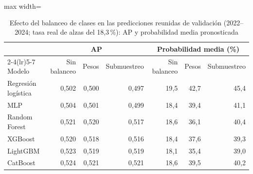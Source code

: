\begin{table}[htbp]\centering\small
\caption{Efecto del balanceo de clases en las predicciones reunidas de validación (2022--2024; tasa real de alzas del 18{,}3\,\%): AP y probabilidad media pronosticada}\label{tab:balanceo}
\begin{adjustbox}{max width=\textwidth}\begin{tabular}{lrrrrrr}\toprule
& \multicolumn{3}{c}{AP} & \multicolumn{3}{c}{Probabilidad media (\%)}\\ \cmidrule(lr){2-4}\cmidrule(lr){5-7}
Modelo & Sin balanceo & Pesos & Submuestreo & Sin balanceo & Pesos & Submuestreo\\ \midrule
Regresión logística & 0{,}502 & 0{,}500 & 0{,}497 & 19{,}5 & 42{,}7 & 45{,}4 \\
MLP & 0{,}504 & 0{,}501 & 0{,}499 & 18{,}4 & 39{,}4 & 41{,}1 \\
Random Forest & 0{,}521 & 0{,}520 & 0{,}517 & 18{,}6 & 36{,}1 & 40{,}4 \\
XGBoost & 0{,}520 & 0{,}518 & 0{,}516 & 18{,}4 & 37{,}6 & 39{,}3 \\
LightGBM & 0{,}523 & 0{,}519 & 0{,}519 & 18{,}1 & 35{,}4 & 39{,}0 \\
CatBoost & 0{,}524 & 0{,}521 & 0{,}521 & 18{,}6 & 39{,}5 & 40{,}2 \\
\bottomrule\end{tabular}\end{adjustbox}\end{table}
